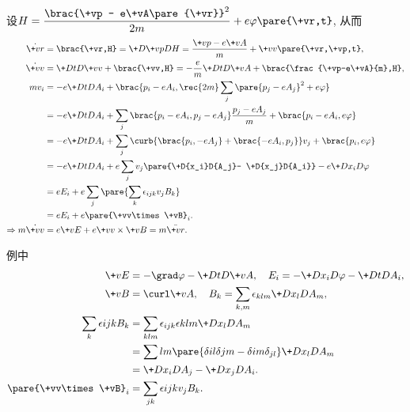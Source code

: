 \documentclass[../LectureNotes.tex]{subfiles}
\begin{document}

\begin{sample}
    \begin{ex}
        设$\displaystyle H = \frac{\brac{\+vp - e\+vA\pare{\+vr}}^2}{2m} + e\varphi\pare{\+vr,t}$, 从而
        \begin{align*}
            \dot{\+vr} &= \brac{\+vr,H} = \+D{\+vp}D{} H = \frac{\+vp-e\+vA}{m} + \+vv\pare{\+vr,\+vp,t}, \\
            \dot{\+vv} &= \+DtD{\+vv} + \brac{\+vv,H} = -\frac{e}{m}\+DtD{\+vA} + \brac{\frac{\+vp-e\+vA}{m},H}, \\
            mv_i &= -e\+DtD{A_i} + \brac{p_i - eA_i, \rec{2m}\sum_j \pare{p_j - eA_j}^2 + e\varphi} \\
            &= -e\+DtD{A_i} + \sum_j \brac{p_i - eA_i,p_j - eA_j}\frac{p_j - eA_j}{m} + \brac{p_i - eA_i, e\varphi} \\
            &= -e\+DtD{A_i} + \sum_j \curb{\brac{p_i,-eA_j} + \brac{-eA_i,p_j}}v_j + \brac{p_i,e\varphi} \\
            &= -e\+DtD{A_i} + e\sum_j v_j \pare{\+D{x_i}D{A_j}- \+D{x_j}D{A_i}} - e\+D{x_i}D{\varphi} \\
            &= e E_i + e\sum_j\pare{\sum_k \epsilon_{ijk} v_jB_k} \\
            &= e E_i + e\pare{\+vv\times\+vB}_i. \\
            \Rightarrow m\dot{\+vv} &= e\+vE + e\+vv\times\+vB = m\ddot{\+vr}.
        \end{align*}
    \end{ex}
\end{sample}
\begin{remark}
    例中
    \begin{align*}
        \+vE &= -\grad\varphi - \+DtD{\+vA},\quad E_i = -\+D{x_i}D{\varphi} - \+DtD{A_i}, \\
        \+vB &= \curl \+vA,\quad B_k = \sum_{k,m}\epsilon_{klm}\+D{x_l}D{} A_m, \\
        \sum_k \epsilon{ijk}B_k &= \sum_{klm} \epsilon_{ijk}\epsilon{klm}\+D{x_l}D{}A_m \\
        &= \sum{lm}\pare{\delta{il}\delta{jm} - \delta{im}\delta_{jl}} \+D{x_l}D{}A_m \\
        &= \+D{x_i}D{A_j} - \+D{x_j}D{A_i}. \\
        \pare{\+vv\times\+vB}_i &= \sum_{jk}\epsilon{ijk} v_j B_k.
    \end{align*}
\end{remark}
\end{document}
